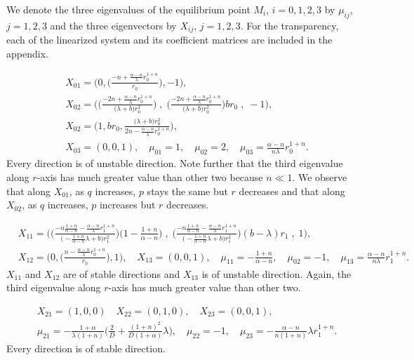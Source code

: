 \documentclass[a4paper,11pt]{article}
\begin{document}
We denote the three eigenvalues of the equilibrium point $M_i$, $i=0,1,2,3$ by $\mu_{ij}$, $j=1,2,3$ and the three eigenvectors by $X_{ij}$, $j=1,2,3$. For the transparency, each of the linearized system and its coefficient matrices are included in the appendix. \medskip

\begin{align*}
&X_{01} = \bigg(0, \Big(\frac{-n+ \frac{\alpha-n}{\lambda}r_0^{1+n}}{r_0}\Big), -1\bigg), \quad\\
 &X_{02} = \bigg( \Big( \frac{-2n + \frac{\alpha-n}{\lambda}r_0^{1+n}}{\big({\lambda}+b\big) r_0^2}\Big) \;,\;\Big( \frac{-2n + \frac{\alpha-n}{\lambda}r_0^{1+n}}{\big({\lambda}+b\big) r_0^2}\Big)br_0\;,\;-1\bigg),\\
&X_{02} = \bigg( 1, br_0, \frac{\big({\lambda}+b\big) r_0^2}{2n - \frac{\alpha-n}{\lambda}r_0^{1+n}}\bigg),\\
 &X_{03} = (0,0,1), \quad \mu_{01} = 1, \quad \mu_{02}= 2, \quad \mu_{03} = \frac{\alpha-n}{n\lambda}r_0^{1+n}.
\end{align*}
Every direction is of unstable direction. Note further that the third eigenvalue along $r$-axis has much greater value than other two because $n \ll 1$. We observe that along $X_{01}$, as $q$ increases, $p$ stays the same but $r$ decreases and that along $X_{02}$, as $q$ increases, $p$ increases but $r$ decreases.
\medskip

\begin{align*}
&X_{11} = \bigg(  \Big(\frac{-n\frac{1+n}{\alpha-n} - \frac{\alpha-n}{\lambda}r_1^{1+n}}{\big(-\frac{1+n}{\alpha-n} \lambda +b\big) r_1^2}\Big)\Big(1-\frac{1+n}{\alpha-n}\Big) \;,\;\Big(\frac{-n\frac{1+n}{\alpha-n} - \frac{\alpha-n}{\lambda}r_1^{1+n}}{\big(-\frac{1+n}{\alpha-n} \lambda +b\big) r_1^2}\Big)(b-\lambda)r_1\;,\;1\bigg),\\
 &X_{12} = \bigg(0, \Big(\frac{n- \frac{\alpha-n}{\lambda}r_0^{1+n}}{r_0}\Big), 1\bigg), \quad
 X_{13} = (0,0,1), \quad \mu_{11} =-\frac{1+n}{\alpha-n}, \quad \mu_{02}=-1, \quad \mu_{13} = \frac{\alpha-n}{n\lambda}r_1^{1+n}.
\end{align*}
$X_{11}$ and $X_{12}$ are of stable directions and $X_{13}$ is of unstable direction. Again, the third eigenvalue along $r$-axis has much greater value than other two.
\medskip

\begin{align*}
 &X_{21} = (1,0,0) \quad X_{22}=(0,1,0), \quad X_{23}=(0,0,1),\\
 &\mu_{21} =-\frac{1+\alpha}{\lambda(1+n)} \Big(\frac{2}{D} + \frac{(1+n)^2}{D(1+\alpha)}\lambda\Big), \quad \mu_{22}=-1, \quad \mu_{23} = -\frac{\alpha-n}{n(1+n)}\lambda r_1^{1+n}.
\end{align*}
Every direction is of stable direction.
\medskip
\end{document}
